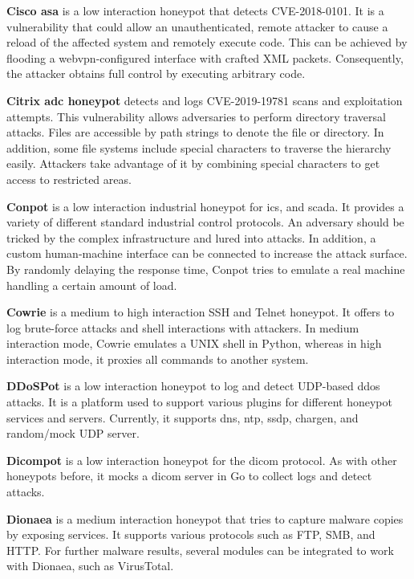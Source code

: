 \textbf{Cisco \ac{asa}} \cite{cymmetria2018} is a low interaction honeypot that detects CVE-2018-0101\cite{CVE-2018-0101}.
It is a vulnerability that could allow an unauthenticated, remote attacker to cause a reload of the affected system and remotely execute code.
This can be achieved by flooding a webvpn-configured interface with crafted XML packets.
Consequently, the attacker obtains full control by executing arbitrary code.

\textbf{Citrix \ac{adc} honeypot} \cite{citrixhoneypot2020} detects and logs CVE-2019-19781\cite{CVE-2019-19781} scans and exploitation attempts.
This vulnerability allows adversaries to perform directory traversal attacks.
Files are accessible by path strings to denote the file or directory.
In addition, some file systems include special characters to traverse the hierarchy easily.
Attackers take advantage of it by combining special characters to get access to restricted areas. \cite{flanders2019}

\textbf{Conpot} \cite{conpot2021} is a low interaction industrial honeypot for \ac{ics}, and \ac{scada}.
It provides a variety of different standard industrial control protocols.
An adversary should be tricked by the complex infrastructure and lured into attacks.
In addition, a custom human-machine interface can be connected to increase the attack surface.
By randomly delaying the response time, Conpot tries to emulate a real machine handling a certain amount of load.

\textbf{Cowrie} \cite{cowrie2021} is a medium to high interaction SSH and Telnet honeypot.
It offers to log brute-force attacks and shell interactions with attackers.
In medium interaction mode, Cowrie emulates a UNIX shell in Python, whereas in high interaction mode, it proxies all commands to another system.

\textbf{DDoSPot} \cite{ddosspot2021} is a low interaction honeypot to log and detect UDP-based \ac{ddos} attacks.
It is a platform used to support various plugins for different honeypot services and servers.
Currently, it supports \acs{dns}, \acs{ntp}, \acs{ssdp}, \acs{chargen}, and random/mock UDP server.

\textbf{Dicompot} \cite{dicompot2021} is a low interaction honeypot for the \ac{dicom} protocol.
As with other honeypots before, it mocks a \ac{dicom} server in Go to collect logs and detect attacks.

\textbf{Dionaea} \cite{dionaea2021} is a medium interaction honeypot that tries to capture malware copies by exposing services.
It supports various protocols such as FTP, SMB, and HTTP.
For further malware results, several modules can be integrated to work with Dionaea, such as VirusTotal.

